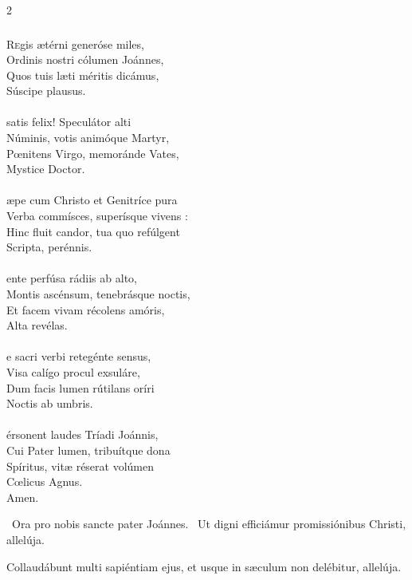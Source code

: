 \documentclass[9pt,twoside]{extarticle}
\begin{document}
\begin{multicols}{2}
{\subsubsection*{\center {}}
\lettrine{R}egis ætérni generóse miles,\\
Ordinis nostri cólumen Joánnes,\\
Quos tuis læti méritis dicámus,\\
Súscipe plausus.\\
\\
 satis felix! Speculátor alti\\
Núminis, votis animóque Martyr,\\
Pœnitens Virgo, memoránde Vates,\\
Mystice Doctor.\\
\\
æpe cum Christo et Genitríce pura\\
Verba commísces, superísque vivens :\\
Hinc fluit candor, tua quo refúlgent\\
Scripta, perénnis.\\
\\
ente perfúsa rádiis ab alto,\\
Montis ascénsum, tenebrásque noctis,\\
Et facem vivam récolens amóris,\\
Alta revélas.\\
\\
e sacri verbi retegénte sensus,\\
Visa calígo procul exsuláre,\\
Dum facis lumen rútilans oríri\\
Noctis ab umbris.\\
\\
érsonent laudes Tríadi Joánnis,\\
Cui Pater lumen, tribuítque dona\\
Spíritus, vitæ réserat volúmen\\
Cœlicus Agnus.\\
Amen.

\begin{tightlist}{}
\item {}~Ora pro nobis sancte pater Joánnes. ~Ut digni efficiámur promissiónibus Christi, allelúja.
\item {} Collaudábunt multi sapiéntiam ejus, et usque in sæculum non delébitur, allelúja.
\end{tightlist}

}
\end{multicols}
\end{document}
